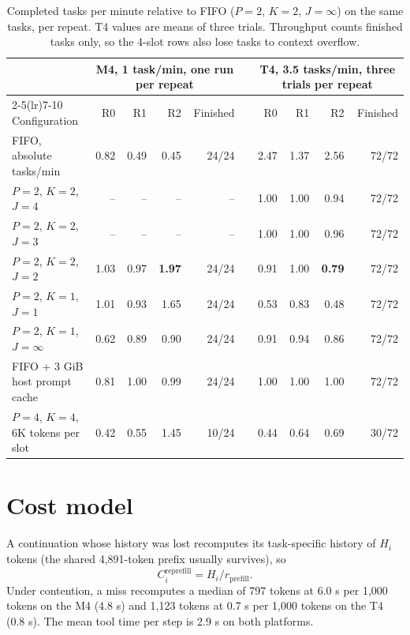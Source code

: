 \documentclass[9pt,twocolumn]{extarticle}
\begin{document}
\begin{table}[h]
\centering
\footnotesize
\setlength{\tabcolsep}{5pt}
\caption{Completed tasks per minute relative to FIFO ($P=2$, $K=2$, $J=\infty$) on the same tasks, per repeat. T4 values are means of three trials. Throughput counts finished tasks only, so the 4-slot rows also lose tasks to context overflow.}
\begin{tabular}{@{}lrrrrcrrrr@{}}
\toprule
& \multicolumn{4}{c}{M4, 1 task/min, one run per repeat} & & \multicolumn{4}{c}{T4, 3.5 tasks/min, three trials per repeat} \\
\cmidrule(lr){2-5}\cmidrule(lr){7-10}
Configuration & R0 & R1 & R2 & Finished & & R0 & R1 & R2 & Finished \\
\midrule
FIFO, absolute tasks/min & 0.82 & 0.49 & 0.45 & 24/24 & & 2.47 & 1.37 & 2.56 & 72/72 \\
\midrule
$P=2$, $K=2$, $J=4$ & -- & -- & -- & -- & & 1.00 & 1.00 & 0.94 & 72/72 \\
$P=2$, $K=2$, $J=3$ & -- & -- & -- & -- & & 1.00 & 1.00 & 0.96 & 72/72 \\
$P=2$, $K=2$, $J=2$ & 1.03 & 0.97 & \textbf{1.97} & 24/24 & & 0.91 & 1.00 & \textbf{0.79} & 72/72 \\
$P=2$, $K=1$, $J=1$ & 1.01 & 0.93 & 1.65 & 24/24 & & 0.53 & 0.83 & 0.48 & 72/72 \\
$P=2$, $K=1$, $J=\infty$ & 0.62 & 0.89 & 0.90 & 24/24 & & 0.91 & 0.94 & 0.86 & 72/72 \\
FIFO + 3 GiB host prompt cache & 0.81 & 1.00 & 0.99 & 24/24 & & 1.00 & 1.00 & 1.00 & 72/72 \\
$P=4$, $K=4$, 6K tokens per slot & 0.42 & 0.55 & 1.45 & 10/24 & & 0.44 & 0.64 & 0.69 & 30/72 \\
\bottomrule
\end{tabular}
\end{table}

\section{Cost model}\label{app:cost}

A continuation whose history was lost recomputes its task-specific history of $H_i$ tokens (the shared 4,891-token prefix usually survives), so
\begin{equation*}
C^{\mathrm{reprefill}}_i = H_i / r_{\mathrm{prefill}} .
\end{equation*}
Under contention, a miss recomputes a median of 797 tokens at 6.0 s per 1,000 tokens on the M4 (4.8 s) and 1,123 tokens at 0.7 s per 1,000 tokens on the T4 (0.8 s). The mean tool time per step is 2.9 s on both platforms.
\end{document}

